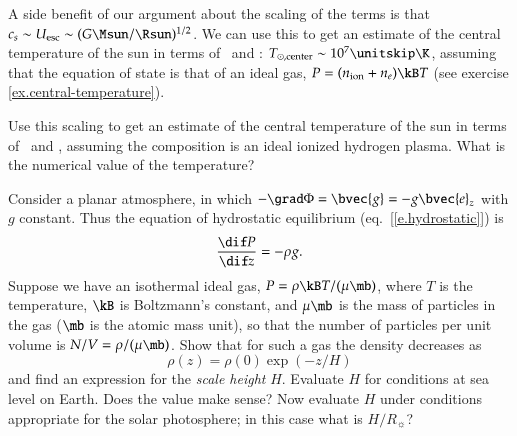 A side benefit of our argument about the scaling of the terms is that $c_{s}\sim U_{\mathrm{esc}} \sim (G\Msun/\Rsun)^{1/2}$.  We can use this to get an estimate of the central temperature of the sun in terms of \Msun\ and \Rsun: $T_{\sun,\mathrm{center}}\sim 10^{7}\nsp\K$, assuming that the equation of state is that of an ideal gas, $P = (n_{\mathrm{ion}} + n_{e})\kB T$ (see exercise \ref{ex.central-temperature}). 

\begin{exercisebox}\label{ex.central-temperature}
Use this scaling to get an estimate of the central temperature of the sun in terms of \Msun\ and \Rsun, assuming the composition is an ideal ionized hydrogen plasma.  What is the numerical value of the temperature?
\end{exercisebox}

\begin{exercisebox}\label{ex:planar-atmosphere}
Consider a planar atmosphere, in which $-\grad\Phi = \bvec{g} = -g \bvec{e}_{z}$ with $g$ constant. Thus the equation of hydrostatic equilibrium (eq.~[\ref{e.hydrostatic}]) is
\begin{equation}\label{e.planar-hydrostatic}
\frac{\dif P}{\dif z} = -\rho g.
\end{equation}
Suppose we have an isothermal ideal gas, $P = \rho\kB T/(\mu\mb)$, where $T$ is the temperature, $\kB$ is Boltzmann's constant, and $\mu\mb$ is the mass of particles in the gas ($\mb$ is the atomic mass unit), so that the number of particles per unit volume is $N/V = \rho/(\mu\mb)$.  Show that for such a gas the density decreases as
\[
\rho(z) = \rho(0) \exp\left(-z/H\right)
\]
and find an expression for the \emph{scale height} $H$.  Evaluate $H$ for conditions at sea level on Earth. Does the value make sense? Now evaluate $H$ under conditions appropriate for the solar photosphere; in this case what is $H/R_{\sun}$?
\end{exercisebox}

